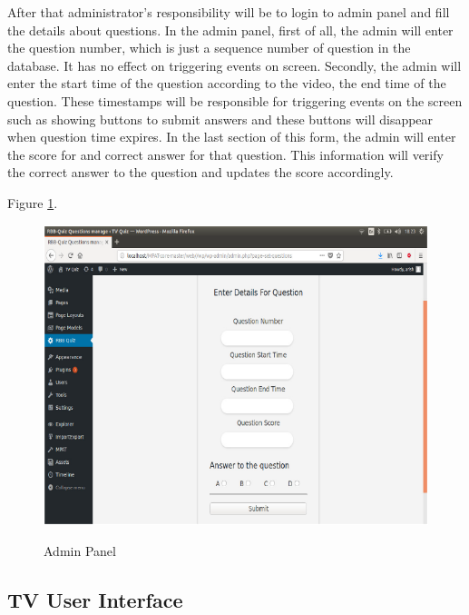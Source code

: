 After that administrator’s responsibility will be to login to
admin panel and fill the details about questions. In the admin
panel, first of all, the admin will enter the question number,
which is just a sequence number of question in the database.
It has no effect on triggering events on screen. Secondly, the
admin will enter the start time of the question according to
the video, the end time of the question. These timestamps
will be responsible for triggering events on the screen such
as showing buttons to submit answers and these buttons will
disappear when question time expires. In the last section of this
form, the admin will enter the score for and correct answer for
that question. This information will verify the correct answer
to the question and updates the score accordingly.
 
    
   

 Figure \ref{fig:Admin-panel}.

\begin{figure}[!ht]
	\centering
\includegraphics[scale=0.6]{figures/Admin-panel.png}\\
	\caption{Admin Panel}
	\label{fig:Admin-panel}
\end{figure} 
    
    
    
    
    
    
    
    
    
    
    

    
    
    

\subsection{TV User Interface}

